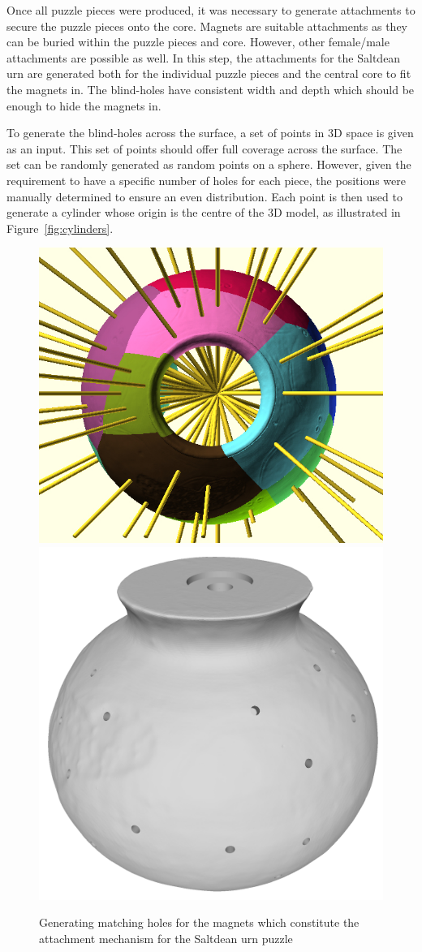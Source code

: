 \documentclass[acmlarge,screen,dvipsnames]{acmart}
\begin{document}
Once all puzzle pieces were produced, it was necessary to generate
attachments to secure the puzzle pieces onto the core. Magnets are
suitable attachments as they can be buried within the puzzle pieces
and core. However, other female/male attachments are possible as
well. In this step, the attachments for the Saltdean urn are generated
both for the individual puzzle pieces and the central core to fit the
magnets in. The blind-holes have consistent width and depth which
should be enough to hide the magnets in.

To generate the blind-holes across the surface, a set of points in 3D
space is given as an input. This set of points should offer full
coverage across the surface. The set can be randomly generated as
random points on a sphere. However, given the requirement to have a
specific number of holes for each piece, the positions were manually
determined to ensure an even distribution. Each point is then used to
generate a cylinder whose origin is the centre of the 3D model, as
illustrated in Figure~\ref{fig:cylinders}.
%
\begin{figure}[htb]
  \centering
  {\includegraphics[width=0.45\linewidth]{images/allcylinders.jpg}}
  {\includegraphics[width=0.45\linewidth]{images/coreholes}}
 \caption{Generating matching holes for the magnets which constitute the attachment mechanism for the Saltdean urn puzzle}
\end{figure}
\end{document}

